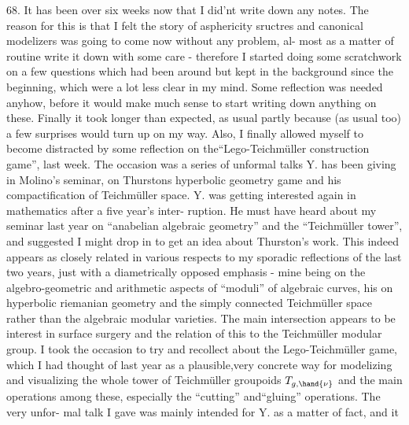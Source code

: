 68. It has been over six weeks now that I did'nt write down any notes.
The reason for this is that I felt the story of asphericity sructres
and canonical modelizers was going to come now without any problem, al-%
most as a matter of routine  write it down with some care - therefore
I started doing some scratchwork on a few questions which had been around
but kept in the background since the beginning,  which were a lot less
clear in my mind. Some reflection  was needed anyhow, before it
would make much sense to start writing down anything on these. Finally it
took longer than expected, as usual\unsure{\deleted{,}}\hand{-} partly because (as usual\deleted{,} too\hand{!}) a
few surprises would turn up on my way. Also, I finally allowed myself to
become distracted by some reflection on the``Lego-Teichmüller construction
game'',   last week. The occasion was a series of  unformal
talks Y. has been giving in Molino's seminar, on Thurstons 
hyperbolic geometry game and his compactification of Teichmüller space.
Y. was getting interested again in mathematics after a five year's inter-%
ruption. He must have heard about my seminar last year on ``anabelian
algebraic geometry'' and the ``Teichmüller tower'', and suggested I might
drop in to get an idea about Thurston's work. This  indeed appears as 
\margin{$\ast$} closely related in various respects to my sporadic reflections\hand{$\ast$} of the last
two years, just with a diametrically opposed emphasis - mine being on
the algebro-geometric and arithmetic aspects of ``moduli'' of algebraic
curves, his on hyperbolic riemanian geometry and the simply connected
 Teichmüller space\unsure{\deleted{,}} \hand{(}rather than the algebraic modular varieties\hand{)}. The main
intersection appears to be interest in surface surgery and the relation of
this to the Teichmüller modular group. I took the occasion to try and
recollect about the Lego-Teichmüller game, which I had thought of last
year as a plausible,very concrete way for modelizing and visualizing the
whole tower of Teichmüller groupoids $T_{g,\hand{\nu}}$ and the main operations among
these, especially the ``cutting'' and``gluing'' operations. The very unfor-%
mal talk I gave was mainly intended for Y. as a matter of fact, and it

